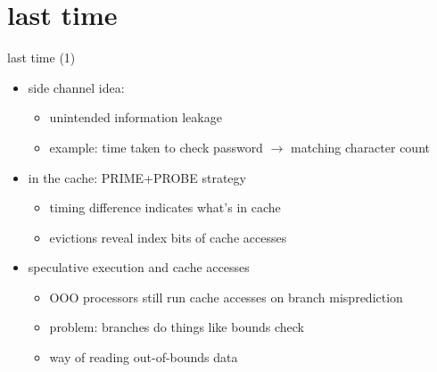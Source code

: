 \date{}
\title{}
\date{}
\usepackage{pdfpages}

\begin{frame}
    \titlepage
\end{frame}


\section{last time}
\begin{frame}{last time (1)}
    \begin{itemize}
    \item side channel idea:
        \begin{itemize}
        \item unintended information leakage
        \item example: time taken to check password $\rightarrow$ matching character count
        \end{itemize}
    \item in the cache: PRIME+PROBE strategy
        \begin{itemize}
        \item timing difference indicates what's in cache
        \item evictions reveal index bits of cache accesses
        \end{itemize}
    \item speculative execution and cache accesses
        \begin{itemize}
        \item OOO processors still run cache accesses on branch misprediction
        \item problem: branches do things like bounds check
        \item way of reading out-of-bounds data
        \end{itemize}
    \end{itemize}
\end{frame}


